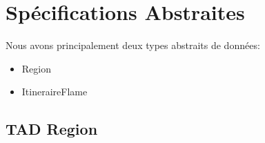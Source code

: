 \section{Spécifications Abstraites}\label{tad}

Nous avons principalement deux types abstraits de données:
\begin{itemize}
  \item Region
  \item ItineraireFlame
\end{itemize}

\subsection{TAD Region}
